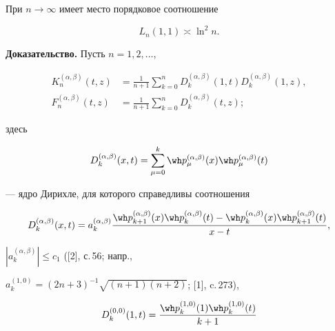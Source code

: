 \begin{thmnonum} При $n \to \infty $ имеет место порядковое соотношение


$$


L_n(1,1) \asymp \ln^2 n.


$$


\end{thmnonum}





{\bf Доказательство.} Пусть $n=1,2,\dotsc$,


\begin{align}


K_n^{(\alpha,\beta)} (t,z)&=\frac {1}{n+1}


\sum_{k=0}^n D_k^{(\alpha,\beta)}(1,t) D_k^{(\alpha,\beta)}(1,z), \\


%


F_n^{(\alpha,\beta)} (t,z)&= \frac {1}{n+1}


\sum_{k=0}^n D_k^{(\alpha,\beta)}(t,z);


\end{align}


здесь


\begin{equation}


D_k^{(\alpha,\beta)} (x,t)=


\sum_{\mu=0}^k \wh p_{\mu}^{(\alpha,\beta)}(x)


\wh p_{\mu}^{(\alpha,\beta)}(t)


\end{equation}


--- ядро Дирихле, для которого справедливы соотношения


\begin{equation}


D_k^{(\alpha,\beta)} (x,t)=a_k^{(\alpha,\beta)}


\frac{ \wh p_{k+1}^{(\alpha,\beta)}(x)


\wh p_k^{(\alpha,\beta)}(t)


-\wh p_k^{(\alpha,\beta)}(x)


\wh p_{k+1}^{(\alpha,\beta)}(t)}{x-t},


\end{equation}


$|a_k^{(\alpha,\beta)}|\le c_1$ ([2], с.\,56; напр.,


$a_k^{(1,0)}=(2n+3)^{-1}\sqrt{(n+1)(n+2)}$; [1], c.\,273),


\begin{equation}


D_k^{(0,0)} (1,t)=\frac{ \wh p_k^{(1,0)}(1) \wh p_k^{(1,0)}(t)}{k+1}


\end{equation}


